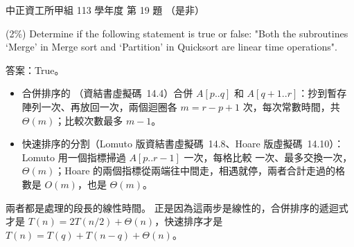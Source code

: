 \begin{pastexam}[label={px:ccu-113-swa-14}]{中正資工所甲組 113 學年度 第 19 題}
（是非）

(2\%) Determine if the following statement is true or false: "Both the subroutines `Merge' in Merge sort and `Partition' in Quicksort are linear time operations".
\end{pastexam}

\begin{pastsoln}
答案：True。

\begin{itemize}
\item 合併排序的 （資結書虛擬碼~14.4）合併 $A[p..q]$ 和 $A[q+1..r]$：抄到暫存陣列一次、再放回一次，兩個迴圈各
$m = r - p + 1$ 次，每次常數時間，共 $\Theta(m)$；比較次數最多 $m - 1$。
\item 快速排序的分割（Lomuto 版資結書虛擬碼~14.8、Hoare 版虛擬碼~14.10）：Lomuto 用一個指標掃過 $A[p..r-1]$ 一次，每格比較
一次、最多交換一次，$\Theta(m)$；Hoare 的兩個指標從兩端往中間走，相遇就停，兩者合計走過的格數是 $O(m)$，也是 $\Theta(m)$。
\end{itemize}
兩者都是處理的段長的線性時間。 正是因為這兩步是線性的，合併排序的遞迴式才是 $T(n) = 2T(n/2) + \Theta(n)$，快速排序才是
$T(n) = T(q) + T(n - q) + \Theta(n)$。
\end{pastsoln}
